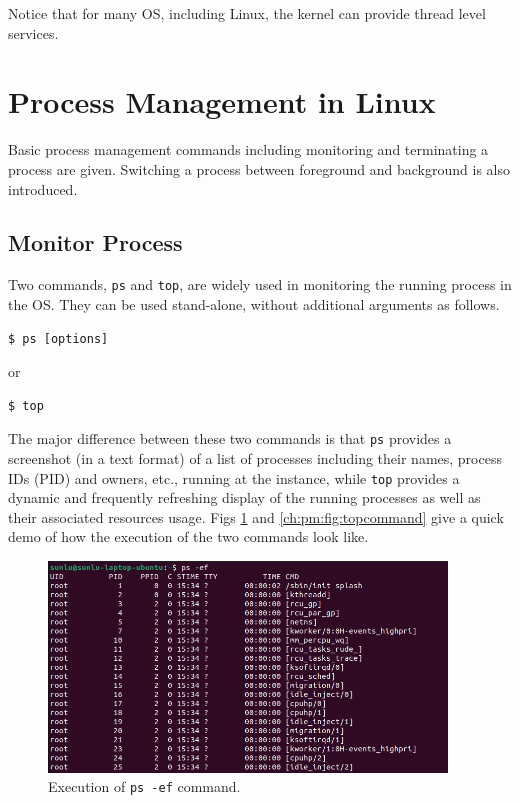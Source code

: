 Notice that for many OS, including Linux, the kernel can provide thread level services.

\section{Process Management in Linux}

Basic process management commands including monitoring and terminating a process are given. Switching a process between foreground and background is also introduced.

\subsection{Monitor Process}

Two commands, \verb|ps| and \verb|top|, are widely used in monitoring the running process in the OS. They can be used stand-alone, without additional arguments as follows.
\begin{lstlisting}
$ ps [options]
\end{lstlisting}
or
\begin{lstlisting}
$ top
\end{lstlisting}

The major difference between these two commands is that \verb|ps| provides a screenshot (in a text format) of a list of processes including their names, process IDs (PID) and owners, etc., running at the instance, while \verb|top| provides a dynamic and frequently refreshing display of the running processes as well as their associated resources usage. Figs \ref{ch:pm:fig:pscommand} and \ref{ch:pm:fig:topcommand} give a quick demo of how the execution of the two commands look like.

\begin{figure}[htbp]
	\centering
	\includegraphics[width=300pt]{chapters/part-1/figures/pscommand.png}
	\caption{Execution of \texttt{ps -ef} command.} \label{ch:pm:fig:pscommand}
\end{figure}


